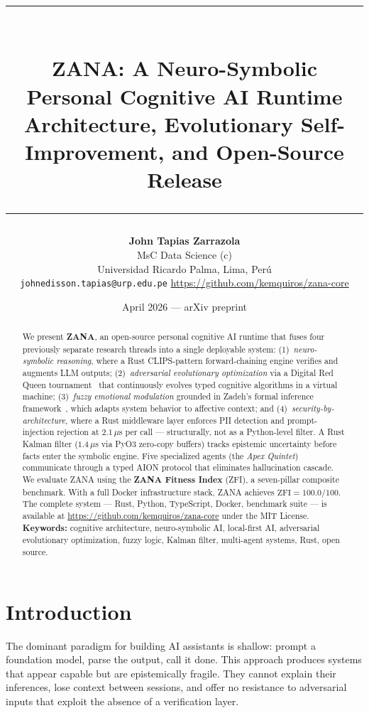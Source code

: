 \documentclass[12pt,a4paper]{article}
\title{
  {\color{xblue}\rule{\linewidth}{2pt}} \\[1em]
  \textbf{\huge ZANA: A Neuro-Symbolic Personal Cognitive AI Runtime} \\[0.4em]
  \large Architecture, Evolutionary Self-Improvement, and Open-Source Release \\[0.4em]
  {\color{xblue}\rule{\linewidth}{0.5pt}}
}
\author{
  \textbf{John Tapias Zarrazola} \\
  \small{MsC Data Science (c)} \\
  \small{Universidad Ricardo Palma, Lima, Per\'{u}} \\
  \small{\texttt{johnedisson.tapias@urp.edu.pe} \quad
    \url{https://github.com/kemquiros/zana-core}}
}
\date{April 2026 \quad --- \quad arXiv preprint}
\begin{document}
\maketitle

\begin{abstract}
\noindent
We present \textbf{ZANA}, an open-source personal cognitive AI runtime that fuses four previously
separate research threads into a single deployable system: (1)~\emph{neuro-symbolic reasoning}, where
a Rust CLIPS-pattern forward-chaining engine verifies and augments LLM outputs; (2)~\emph{adversarial
evolutionary optimization} via a Digital Red Queen tournament~\cite{kumar2025redqueen} that continuously
evolves typed cognitive algorithms in a virtual machine; (3)~\emph{fuzzy emotional modulation}
grounded in Zadeh's formal inference framework~\cite{zadeh1965fuzzysets,zadeh1975fuzzylogic}, which
adapts system behavior to affective context; and (4)~\emph{security-by-architecture}, where a Rust
middleware layer enforces PII detection and prompt-injection rejection at $2.1\,\mu$s per call ---
structurally, not as a Python-level filter. A Rust Kalman filter ($1.4\,\mu$s via PyO3 zero-copy
buffers) tracks epistemic uncertainty before facts enter the symbolic engine. Five specialized agents
(the \emph{Apex Quintet}) communicate through a typed AION protocol that eliminates hallucination
cascade. We evaluate ZANA using the \textbf{ZANA Fitness Index} (ZFI), a seven-pillar composite
benchmark. With a full Docker infrastructure stack, ZANA achieves $\mathrm{ZFI} = 100.0/100$.
The complete system --- Rust, Python, TypeScript, Docker, benchmark suite --- is available at
\url{https://github.com/kemquiros/zana-core} under the MIT License.
\bigskip\\
\noindent\textbf{Keywords:} cognitive architecture, neuro-symbolic AI, local-first AI, adversarial
evolutionary optimization, fuzzy logic, Kalman filter, multi-agent systems, Rust, open source.
\end{abstract}

\newpage
\tableofcontents
\newpage

\section{Introduction}

The dominant paradigm for building AI assistants is shallow: prompt a foundation model, parse the
output, call it done. This approach produces systems that appear capable but are epistemically fragile.
They cannot explain their inferences, lose context between sessions, and offer no resistance to
adversarial inputs that exploit the absence of a verification layer.
\end{document}
